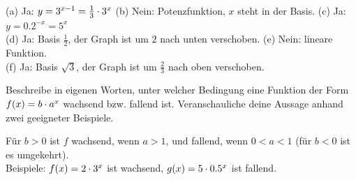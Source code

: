 \documentclass[11pt]{exam}
\begin{document}
\begin{questions}
{\begin{solution}
		(a) Ja: $y=3^{x-1}=\frac{1}{3}\cdot3^x$ \quad (b) Nein: Potenzfunktion, $x$ steht in der Basis. \quad (c) Ja: $y=0.2^{-x}=5^x$\\
		(d) Ja: Basis $\frac{1}{2}$, der Graph ist um $2$ nach unten verschoben. \quad (e) Nein: lineare Funktion.\\
		(f) Ja: Basis $\sqrt{3}$, der Graph ist um $\frac{2}{3}$ nach oben verschoben.
\end{solution}}
{}

\question[2]
Beschreibe in eigenen Worten, unter welcher Bedingung eine Funktion der Form $f(x)=b\cdot a^x$ wachsend bzw. fallend ist. Veranschauliche deine Aussage anhand zwei geeigneter Beispiele.
{\begin{solution}
		Für $b>0$ ist $f$ wachsend, wenn $a>1$, und fallend, wenn $0<a<1$ (für $b<0$ ist es umgekehrt).\\
		Beispiele: $f(x)=2\cdot3^x$ ist wachsend, $g(x)=5\cdot0.5^x$ ist fallend.
\end{solution}}
{}


\end{questions}
\end{document}
